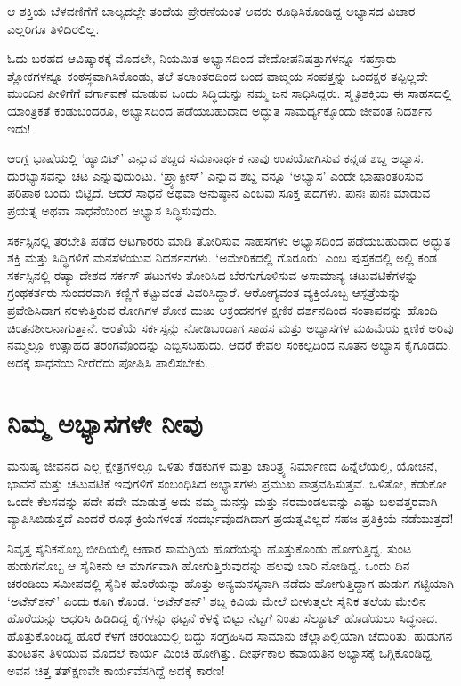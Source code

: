ಆ ಶಕ್ತಿಯ ಬೆಳವಣಿಗೆಗೆ ಬಾಲ್ಯದಲ್ಲೇ ತಂದೆಯ ಪ್ರೇರಣೆಯಂತೆ ಅವರು ರೂಢಿಸಿಕೊಂಡಿದ್ದ ಅಭ್ಯಾಸದ ವಿಚಾರ ಎಲ್ಲರಿಗೂ ತಿಳಿದಿರಲಿಲ್ಲ.

ಓದು ಬರಹದ ಆವಿಷ್ಕಾರಕ್ಕೆ ಮೊದಲೇ, ನಿಯಮಿತ ಅಭ್ಯಾಸದಿಂದ ವೇದೋಪನಿಷತ್ತುಗಳನ್ನೂ ಸಹಸ್ರಾರು ಶ್ಲೋಕಗಳನ್ನೂ ಕಂಠಸ್ಥವಾಗಿಸಿಕೊಂಡು, ತಲೆ ತಲಾಂತರದಿಂದ ಬಂದ ವಾಙ್ಮಯ ಸಂಪತ್ತನ್ನು ಒಂದಕ್ಷರ ತಪ್ಪಿಲ್ಲದೇ ಮುಂದಿನ ಪೀಳಿಗೆಗೆ ವರ್ಗಾವಣೆ ಮಾಡುವ ಒಂದು ಸಿದ್ಧಿಯನ್ನು ನಮ್ಮ ಜನ ಸಾಧಿಸಿದ್ದರು. ಸ್ಮೃತಿಶಕ್ತಿಯ ಈ ಸಾಹಸದಲ್ಲಿ ಯಾಂತ್ರಿಕತೆ ಕಂಡುಬಂದರೂ, ಅಭ್ಯಾಸದಿಂದ ಪಡೆಯಬಹುದಾದ ಅದ್ಭುತ ಸಾಮರ್ಥ್ಯಕ್ಕೊಂದು ಜೀವಂತ ನಿದರ್ಶನ ಇದು!

ಆಂಗ್ಲ ಭಾಷೆಯಲ್ಲಿ ‘ಹ್ಯಾಬಿಟ್​’ ಎನ್ನುವ ಶಬ್ದದ ಸಮಾನಾರ್ಥಕ ನಾವು ಉಪಯೋಗಿಸುವ ಕನ್ನಡ ಶಬ್ದ ಅಭ್ಯಾಸ. ದುರಭ್ಯಾಸವನ್ನು ಚಟ ಎನ್ನುವುದುಂಟು. ‘ಪ್ರ್ಯಾಕ್ಟೀಸ್​’ ಎನ್ನುವ ಶಬ್ದ ವನ್ನೂ ‘ಅಭ್ಯಾಸ’ ಎಂದೇ ಭಾಷಾಂತರಿಸುವ ಪರಿಪಾಠ ಬಂದು ಬಿಟ್ಟಿದೆ. ಆದರೆ ಸಾಧನೆ ಅಥವಾ ಅನುಷ್ಠಾನ ಎಂಬವು ಸೂಕ್ತ ಪದಗಳು. ಪುನಃ ಪುನಃ ಮಾಡುವ ಪ್ರಯತ್ನ ಅಥವಾ ಸಾಧನೆಯಿಂದ ಅಭ್ಯಾಸ ಸಿದ್ಧಿಸುವುದು.

ಸರ್ಕಸ್ಸಿನಲ್ಲಿ ತರಬೇತಿ ಪಡೆದ ಆಟಗಾರರು ಮಾಡಿ ತೋರಿಸುವ ಸಾಹಸಗಳು ಅಭ್ಯಾಸದಿಂದ ಪಡೆಯಬಹುದಾದ ಅದ್ಭುತ ಶಕ್ತಿ ಮತ್ತು ಸಿದ್ಧಿಗಳಿಗೆ ಮನಸೆಳೆಯುವ ನಿದರ್ಶನಗಳು. ‘ಅಮೇರಿಕದಲ್ಲಿ ಗೊರೂರು’ ಎಂಬ ಪುಸ್ತಕದಲ್ಲಿ ಅಲ್ಲಿ ಕಂಡ ಸರ್ಕಸ್ಸಿನಲ್ಲಿ ರಷ್ಯಾ ದೇಶದ ಸರ್ಕಸ್ ಪಟುಗಳು ತೋರಿಸಿದ ಬೆರಗುಗೊಳಿಸುವ ಅಸಾಮಾನ್ಯ ಚಟುವಟಿಕೆಗಳನ್ನು ಗ್ರಂಥಕರ್ತರು ಸುಂದರವಾಗಿ ಕಣ್ಣಿಗೆ ಕಟ್ಟುವಂತೆ ವಿವರಿಸಿದ್ದಾರೆ. ಆರೋಗ್ಯವಂತ ವ್ಯಕ್ತಿಯೊಬ್ಬ ಆಸ್ಪತ್ರೆಯನ್ನು ಪ್ರವೇಶಿಸಿದಾಗ ನರಳುತ್ತಿರುವ ರೋಗಿಗಳ ಶೋಕ ದುಃಖ ಆಕ್ರಂದನಗಳ ಕ್ಷಣಿಕ ದರ್ಶನದಿಂದ ಸಂತಾಪವನ್ನು ಹೊಂದಿ ಚಿಂತನಶೀಲನಾಗುತ್ತಾನೆ. ಅಂತೆಯೆ ಸರ್ಕಸ್ಸನ್ನು ನೋಡಿಬಂದಾಗ ಸಾಹಸ ಮತ್ತು ಅಭ್ಯಾಸಗಳ ಮಹಿಮೆಯ ಕ್ಷಣಿಕ ಅರಿವು ನಮ್ಮಲ್ಲೂ ಉತ್ಸಾಹದ ತರಂಗವೊಂದನ್ನು ಎಬ್ಬಿಸಬಹುದು. ಆದರೆ ಕೇವಲ ಸಂಕಲ್ಪದಿಂದ ನೂತನ ಅಭ್ಯಾಸ ಕೈಗೂಡದು. ಅದಕ್ಕೆ ಸಾಧನೆಯ ನೀರೆರೆದು ಪೋಷಿಸಿ ಪಾಲಿಸಬೇಕು.


\section*{ನಿಮ್ಮ ಅಭ್ಯಾಸಗಳೇ ನೀವು}


ಮನುಷ್ಯ ಜೀವನದ ಎಲ್ಲ ಕ್ಷೇತ್ರಗಳಲ್ಲೂ ಒಳಿತು ಕೆಡಕುಗಳ ಮತ್ತು ಚಾರಿತ್ರ್ಯ ನಿರ್ಮಾಣದ ಹಿನ್ನೆಲೆಯಲ್ಲಿ, ಯೋಚನೆ, ಭಾವನೆ ಮತ್ತು ಚಟುವಟಿಕೆ ಇವುಗಳಿಗೆ ಸಂಬಂಧಿಸಿದ ಅಭ್ಯಾಸಗಳು ಪ್ರಮುಖ ಪಾತ್ರವಹಿಸುತ್ತವೆ. ಒಳಿತೋ, ಕೆಡುಕೋ ಒಂದೇ ಕೆಲಸವನ್ನು ಪದೇ ಪದೇ ಮಾಡುತ್ತ ಅದು ನಮ್ಮ ಮನಸ್ಸು ಮತ್ತು ನರಮಂಡಲವನ್ನು ಎಷ್ಟು ಬಲವತ್ತರವಾಗಿ ವ್ಯಾಪಿಸಿಬಿಡುತ್ತದೆ ಎಂದರೆ ರೂಢ ಕ್ರಿಯೆಗಳಂತೆ ಸಂದರ್ಭವೊದಗಿದಾಗ ಪ್ರಯತ್ನವಿಲ್ಲದೆ ಸಹಜ ಪ್ರತಿಕ್ರಿಯೆ ನಡೆಯುತ್ತದೆ!

ನಿವೃತ್ತ ಸೈನಿಕನೊಬ್ಬ ಬೀದಿಯಲ್ಲಿ ಆಹಾರ ಸಾಮಗ್ರಿಯ ಹೊರೆಯನ್ನು ಹೊತ್ತುಕೊಂಡು ಹೋಗುತ್ತಿದ್ದ. ತುಂಟ ಹುಡುಗನೊಬ್ಬ ಆ ಸೈನಿಕನು ಆ ಮಾರ್ಗವಾಗಿ ಹೋಗುತ್ತಿರುವುದನ್ನು ಹಲವು ಬಾರಿ ನೋಡಿದ್ದ. ಒಂದು ದಿನ ಚರಂಡಿಯ ಸಮೀಪದಲ್ಲಿ ಸೈನಿಕ ಹೊರೆಯನ್ನು ಹೊತ್ತು ಅನ್ಯಮನಸ್ಕನಾಗಿ ನಡೆದು ಹೋಗುತ್ತಿದ್ದಾಗ ಹುಡುಗ ಗಟ್ಟಿಯಾಗಿ ‘ಅಟೆನ್​ಶನ್​’ ಎಂದು ಕೂಗಿ ಕೊಂಡ. ‘ಅಟೆನ್​ಶನ್​’ ಶಬ್ದ ಕಿವಿಯ ಮೇಲೆ ಬೀಳುತ್ತಲೇ ಸೈನಿಕ ತಲೆಯ ಮೇಲಿನ ಹೊರೆಯನ್ನು ಆಧರಿಸಿ ಹಿಡಿದಿದ್ದ ಕೈಗಳನ್ನು ಥಟ್ಟನೆ ಕೆಳಕ್ಕೆ ಬಿಟ್ಟು ನೆಟ್ಟಗೆ ನಿಂತು ಸೆಲ್ಯೂಟ್ ಹೊಡೆಯಲು ಸಿದ್ಧನಾದ. ಹೊತ್ತುಕೊಂಡಿದ್ದ ಹೊರೆ ಕೆಳಗೆ ಚರಂಡಿಯಲ್ಲಿ ಬಿದ್ದು ಸಂಗ್ರಹಿಸಿದ ಸಾಮಾನು ಚೆಲ್ಲಾಪಿಲ್ಲಿಯಾಗಿ ಚೆದುರಿತು. ಹುಡುಗನ ತುಂಟತನ ತಿಳಿಯುವ ಮೊದಲೆ ಕಾರ್ಯ ಮಿಂಚಿ ಹೋಗಿತ್ತು. ದೀರ್ಘಕಾಲ ಕವಾಯತಿನ ಅಭ್ಯಾಸಕ್ಕೆ ಒಗ್ಗಿಕೊಂಡಿದ್ದ ಅವನ ಚಿತ್ತ ತತ್​ಕ್ಷಣವೇ ಕಾರ್ಯವೆಸಗಿದ್ದೆ ಅದಕ್ಕೆ ಕಾರಣ!

